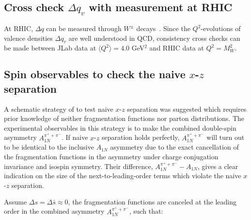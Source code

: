 \subsection{Cross check $\Delta q_v$ with measurement at RHIC}

At RHIC,  $\Delta q$ can be measured through 
$W^\pm$ decays~\cite{bunce00}.  Since the $Q^2$-evolutions of valence densities  $\Delta q_v$ 
are well understood in QCD, consistency cross checks can be made between JLab data at $\langle Q^2 \rangle=4.0$ GeV$^2$
and RHIC data at $Q^2 = M_W^2$.   

\subsection{Spin observables to check the \lo naive $x$-$z$ separation}

A schematic strategy of to test \lo naive $x$-$z$ separation
was suggested \cite{leader2} which requires prior knowledge of neither fragmentation functions nor
parton distributions. The experimental observables in this strategy
is to make the combined double-spin asymmetry $A_{1N}^{\pi^+ + \pi^-}$. 
If \lo naive $x$-$z$ separation holds perfectly, 
$A_{1N}^{\pi^+ + \pi^-}$ will turn out to be identical to the inclusive 
$A_{1N}$ asymmetry due to the exact
 cancellation of the fragmentation functions in the asymmetry 
under charge conjugation invariance and isospin symmetry.
Their difference, $A_{1N}^{\pi^+ + \pi^-}-A_{1N}$, gives a clear indication 
on the size of the next-to-leading-order terms which violate the naive \lo 
$x$-$z$ separation.

Assume $\Delta s = \Delta \bar{s} \approx 0$, 
 the fragmentation functions are canceled at the leading order in 
 the combined asymmetry $A_{1N}^{\pi^+ + \pi^-}$, such that: 

